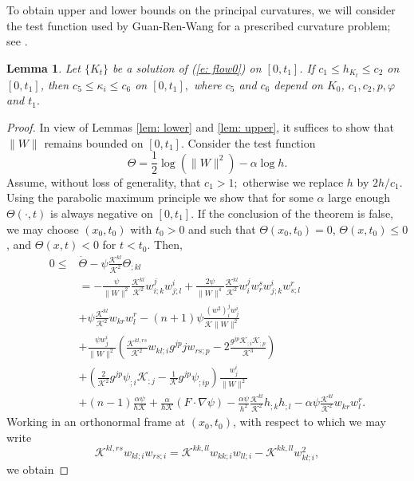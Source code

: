 \documentclass{amsart}
\newtheorem{lemma}[theorem]{Lemma}
\theoremstyle{definition}
\theoremstyle{remark}
\numberwithin{equation}{section}
\begin{document}
 To obtain upper and lower bounds on the principal curvatures, we will consider the test function used by Guan-Ren-Wang for a prescribed curvature problem; see \cite[(4.2)]{Guan}.
\begin{lemma}\label{lem: final}
Let $\{K_t\}$ be a solution of (\ref{e: flow0}) on $[0,t_1]$. If $c_1\leq h_{K_t}\leq c_2$ on $[0,t_1]$, then $c_5\leq \kappa_i\le c_6$ on $[0,t_1],$ where $c_5$ and $c_6$ depend on $K_0$, $c_1,c_2,p,\varphi$ and $t_1.$
\end{lemma}
\begin{proof}
In view of Lemmas \ref{lem: lower} and \ref{lem: upper}, it suffices to show that $\|W\|$ remains bounded on $[0,t_1]$. Consider the test function
\[\Theta=\frac 12\log(\|W\|^2)-\alpha\log h.\]
Assume, without loss of generality, that $c_1> 1;$ otherwise we replace $h$ by $2h/c_1.$
Using the parabolic maximum principle we show that for some $\alpha$ large enough $\Theta(\cdot,t)$ is always negative on $[0,t_1]$. If the conclusion of the theorem is false, we may choose $(x_0,t_0)$ with $t_0>0$ and such that $\Theta(x_0,t_0)=0$, $\Theta(x, t_0) \leq 0$, and $\Theta(x,t) < 0$ for $t<t_0$. Then,
\begin{align*}
0 \leq& \dot{\Theta}-\psi\frac{\mathcal{K}^{kl}}{\mathcal{K}^2}\Theta_{;kl} \\
&= -\frac{\psi}{\|W\|^2} \frac{\mathcal{K}^{kl}}{\mathcal{K}^2} w_{i;k}^j w_{j;l}^i + \frac{2\psi}{\|W\|^4} \frac{\mathcal{K}^{kl}}{\mathcal{K}^2} w^j_iw^s_r w^i_{j;k} w^r_{s;l} \\
&+ \psi \frac{\mathcal{K}^{kl}}{\mathcal{K}^2} w_{kr}w_l^r - (n+1)\psi \frac{(w^2)_i^jw_j^i}{\mathcal{K}\|W\|^2} \\
&+ \frac{\psi w^i_j}{\|W\|^2} \left(\frac{\mathcal{K}^{kl,rs}}{\mathcal{K}^2} w_{kl;i} g^{jp}jw_{rs;p} - 2\frac{g^{jp} \mathcal{K}_{;i}\mathcal{K}_{;p}}{\mathcal{K}^3}\right) \\
&+ \left(\frac{2}{\mathcal{K}^2} g^{jp}\psi_{;i} \mathcal{K}_{;j} - \frac{1}{\mathcal{K}} g^{jp} \psi_{;ip}\right) \frac{w^i_j}{\|W\|^2} \\
& +(n-1) \frac{\alpha\psi}{h\mathcal{K}} + \frac{\alpha}{h\mathcal{K}} (F\cdot\nabla\psi) - \frac{\alpha\psi}{h^2} \frac{\mathcal{K}^{kl}}{\mathcal{K}^2} h_{;k}h_{;l} - \alpha\psi \frac{\mathcal{K}^{kl}}{\mathcal{K}^2} w_{kr}w_l^r.
\end{align*}
Working in an orthonormal frame at $(x_0,t_0)$, with respect to which we may write $$\mathcal{K}^{kl,rs}w_{kl;i}w_{rs;i}=\mathcal{K}^{kk,ll}w_{kk;i}w_{ll;i}-\mathcal{K}^{kk,ll}w_{kl;i}^2,$$ we obtain

\end{proof}
\end{document}
